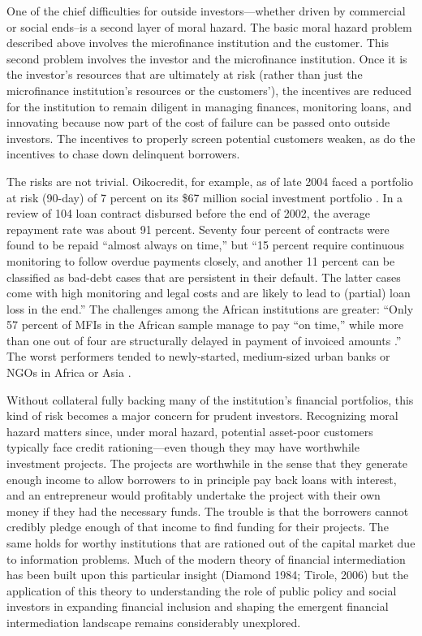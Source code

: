 \documentclass[letterpaper, 12pt]{article}
\begin{document}

One of the chief difficulties for outside investors---whether driven by commercial or social ends--is a second layer of moral hazard. The basic moral hazard problem described above involves the microfinance institution and the customer. This second problem involves the investor and the microfinance institution. Once it is the investor's resources that are ultimately at risk (rather than just the microfinance institution's resources or the customers'), the incentives are reduced for the institution to remain diligent in managing finances, monitoring loans, and innovating because now part of the cost of failure can be passed onto outside investors. The incentives to properly screen potential customers weaken, as do the incentives to chase down delinquent borrowers.

The risks are not trivial. Oikocredit, for example, as of late 2004 faced a portfolio at risk (90-day) of 7 percent on its \$67 million
social investment portfolio \citep[][33]{heinen2005}. In a review of 104 loan contract disbursed before the end of 2002, the average repayment rate
was about 91 percent. Seventy four percent of contracts were found to be repaid ``almost always on time,'' but ``15 percent require continuous
monitoring to follow overdue payments closely, and another 11 percent can be classified as bad-debt cases that are persistent in their default. The latter cases come with high monitoring and legal costs and are likely to lead to (partial) loan loss in the end.'' The challenges among the African institutions are greater: ``Only 57 percent of MFIs in the African sample manage to pay ``on time,'' while more than one out of
four are structurally delayed in payment of invoiced amounts \citep[][34-35]{heinen2005} .'' The worst performers tended to newly-started,
medium-sized urban banks or NGOs in Africa or Asia \citep[][39]{heinen2005}.

Without collateral fully backing many of the institution's financial portfolios, this kind of risk becomes a major concern for prudent
investors. Recognizing moral hazard matters since, under moral hazard, potential asset-poor customers typically face credit rationing---even
though they may have worthwhile investment projects. The projects are worthwhile in the sense that they generate enough income to allow borrowers to in principle pay back loans with interest, and an entrepreneur would profitably undertake the project with their own money if they had the necessary funds.  The trouble is that the borrowers cannot credibly pledge enough of that income to find funding for their projects. The same holds for worthy institutions that are rationed out of the capital market due to
information problems. Much of the modern theory of financial intermediation has been built upon this particular insight (Diamond 1984; Tirole, 2006) but the application of this theory to understanding the role of public policy and social investors in expanding financial inclusion and shaping the emergent financial intermediation landscape remains considerably unexplored.
\end{document}
